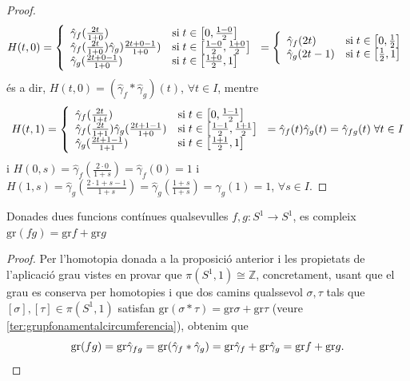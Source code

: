 \documentclass[../main.tex]{subfiles}
\begin{document}
\begin{proof}
\begin{equation}
    \notag
    H(t,0) = \left\{
    \begin{array}{ll}
        \hat{\gamma}_f(\frac{2t}{1+0}) & \mathrm{si}\;t\in\left[0,\frac{1-0}{2}\right] \\
        \hat{\gamma}_f(\frac{2t}{1+0})\hat{\gamma}_g)\frac{2t+0-1}{1+0}) & \mathrm{si}\;t\in\left[\frac{1-0}{2},\frac{1+0}{2}\right] \\
        \hat{\gamma}_g(\frac{2t+0-1}{1+0}) & \mathrm{si} \;t\in\left[\frac{1+0}{2},1\right]
    \end{array}
    \right. = \left\{
    \begin{array}{ll}
        \hat{\gamma}_f(2t) & \mathrm{si}\;t\in\left[0,\frac{1}{2}\right] \\
        \hat{\gamma}_g(2t-1) & \mathrm{si}\;t\in\left[\frac{1}{2},1\right]
    \end{array}
    \right.
\end{equation}
és a dir, $H(t,0) = (\hat{\gamma}_f*\hat{\gamma}_g)(t)$, $\forall t\in I$, mentre
\begin{equation}
    \notag
    H(t,1) = \left\{
    \begin{array}{ll}
        \hat{\gamma}_f(\frac{2t}{1+t}) & \mathrm{si}\;t\in\left[0,\frac{1-1}{2}\right] \\
        \hat{\gamma}_f(\frac{2t}{1+1})\hat{\gamma}_g(\frac{2t+1-1}{1+0}) & \mathrm{si}\;t\in\left[\frac{1-1}{2},\frac{1+1}{2}\right] \\
        \hat{\gamma}_g(\frac{2t+1-1}{1+1}) & \mathrm{si}\;t\in\left[\frac{1+1}{2},1\right]
    \end{array}
    \right. = \hat{\gamma}_f(t)\hat{\gamma}_g(t) = \hat{\gamma}_{fg}(t)\;\forall t\in I
\end{equation}
i $H(0,s) = \hat{\gamma}_f(\frac{2\cdotp 0}{1+s}) = \hat{\gamma}_f(0) = 1$ i $H(1,s) = \hat{\gamma}_g(\frac{2\cdotp 1+s-1}{1+s}) = \hat{\gamma}_g(\frac{1+s}{1+s}) = \hat{\gamma}_g(1)= 1$, $\forall s\in I$.
\end{proof}

\begin{coro}
\label{coro:grfmultiplicativa} Donades dues funcions contínues qualsevulles $f,g:S^1\rightarrow S^1$, es compleix $\mathrm{gr}(fg) = \mathrm{gr}f+\mathrm{gr}g$
\end{coro}
\begin{proof}
Per l'homotopia donada a la proposició anterior i les propietats de l'aplicació grau vistes en provar que $\pi(S^1,1)\cong\mathbb{Z}$, concretament, usant que el grau es conserva per homotopies i que dos camins qualssevol $\sigma,\tau$ tals que $[\sigma],[\tau]\in\pi(S^1,1)$ satisfan $\mathrm{gr}(\sigma*\tau) = \mathrm{gr}\sigma+\mathrm{gr}\tau$ (veure \ref{ter:grupfonamentalcircumferencia}), obtenim que
\begin{equation}
    \notag
    \mathrm{gr}(fg) = \mathrm{gr}\hat{\gamma}_{fg} = \mathrm{gr}(\hat{\gamma}_f*\hat{\gamma}_g) = \mathrm{gr}\hat{\gamma}_f+\mathrm{gr}\hat{\gamma}_g = \mathrm{gr}f+\mathrm{gr}g.
\end{equation}
\end{proof}
\end{document}
